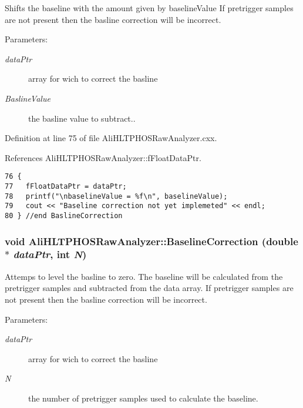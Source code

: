 Shifts the baseline with the amount given by baseline\-Value If pretrigger samples are not present then the basline correction will be incorrect. \begin{Desc}
\item[Parameters:]
\begin{description}
\item[{\em data\-Ptr}]array for wich to correct the basline \item[{\em Basline\-Value}]the basline value to subtract.. \end{description}
\end{Desc}


Definition at line 75 of file Ali\-HLTPHOSRaw\-Analyzer.cxx.

References Ali\-HLTPHOSRaw\-Analyzer::f\-Float\-Data\-Ptr.

\footnotesize\begin{verbatim}76 {
77   fFloatDataPtr = dataPtr;   
78   printf("\nbaselineValue = %f\n", baselineValue);
79   cout << "Baseline correction not yet implemeted" << endl;
80 } //end BaslineCorrection
\end{verbatim}\normalsize 


\subsubsection{\setlength{\rightskip}{0pt plus 5cm}void Ali\-HLTPHOSRaw\-Analyzer::Baseline\-Correction (double $\ast$ {\em data\-Ptr}, int {\em N})\hspace{0.3cm}{\tt  [inherited]}}\label{classAliHLTPHOSRawAnalyzer_AliHLTPHOSRawAnalyzerPeakFindera7}


Attemps to level the basline to zero. The baseline will be calculated from the pretrigger samples and subtracted from the data array. If pretrigger samples are not present then the basline correction will be incorrect. \begin{Desc}
\item[Parameters:]
\begin{description}
\item[{\em data\-Ptr}]array for wich to correct the basline \item[{\em N}]the number of pretrigger samples used to calculate the baseline. \end{description}
\end{Desc}


